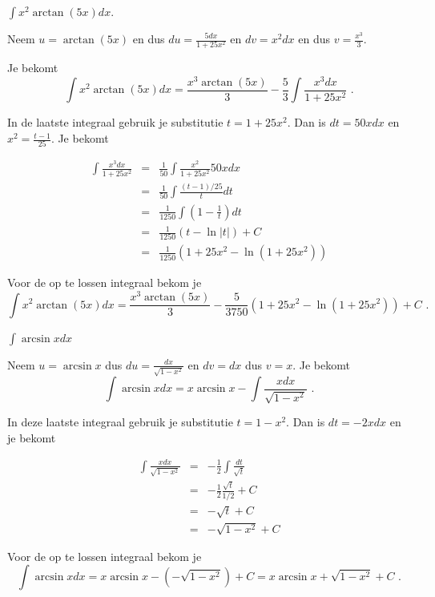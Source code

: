 \begin{voorbeeld}
	
$\int x^2 \arctan(5x)dx$.

Neem $u=\arctan (5x)$ en dus $du=\frac{5dx}{1+25x^2}$ en $dv=x^2dx$ en dus $v=\frac{x^3}{3}$.

Je bekomt
\[
\int x^2 \arctan(5x)dx=\frac{x^3 \arctan (5x)}{3}-\frac{5}{3} \int \frac {x^3dx}{1+25x^2} \text { .}
\]

In de laatste integraal gebruik je substitutie $t=1+25x^2$.
Dan is $dt=50xdx$ en $x^2=\frac{t-1}{25}$.
Je bekomt

\begin{eqnarray}
\int \frac {x^3dx}{1+25x^2}&=&\frac{1}{50}\int \frac{x^2}{1+25x^2}50xdx\\
&=&\frac{1}{50}\int \frac{(t-1)/25}{t}dt \\
&=&\frac{1}{1250}\int \left( 1-\frac{1}{t}  \right)dt \\
&=&\frac{1}{1250}\left(  t-\ln \vert t \vert  \right)+C\\
&=&\frac{1}{1250} \left( 1+25x^2-\ln \left( 1+25x^2 \right) \right)
\end{eqnarray}

Voor de op te lossen integraal bekom je
\[
\int x^2 \arctan(5x)dx=\frac{x^3 \arctan (5x)}{3}-\frac{5}{3750} \left( 1+25x^2-\ln \left( 1+25x^2 \right) \right)+C \text { .}
\]

\end{voorbeeld}

\begin{voorbeeld}
	$\int \arcsin x dx$

Neem $u=\arcsin x$ dus $du=\frac{dx}{\sqrt {1-x^2}}$ en $dv=dx$ dus $v=x$.
Je bekomt
\[
\int \arcsin x dx=x \arcsin x-\int \frac{xdx}{\sqrt{1-x^2}} \text { .}
\]

In deze laatste integraal gebruik je substitutie $t=1-x^2$.
Dan is $dt=-2xdx$ en je bekomt

\begin{eqnarray*}
\int \frac{xdx}{\sqrt{1-x^2}}&=&-\frac{1}{2}\int \frac{dt}{\sqrt{t}} \\
&=&-\frac{1}{2}\frac{\sqrt{t}}{1/2}+C \\
&=&-\sqrt{t}+C \\
&=&-\sqrt{1-x^2}+C
\end{eqnarray*}

Voor de op te lossen integraal bekom je
\[
\int \arcsin x dx=x \arcsin x-\left( -\sqrt{1-x^2}  \right)+C=x \arcsin x+\sqrt{1-x^2} +C \text { .}
\]

\end{voorbeeld}


